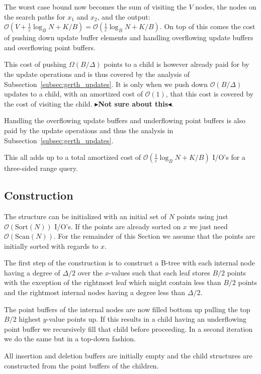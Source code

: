 \documentclass[twoside,11pt,openright]{report}
\def \epsilon {\varepsilon}
\newcommand{\todo}[1]{{\color[rgb]{.5,0,0}\textbf{$\blacktriangleright$#1$\blacktriangleleft$}}}
\begin{document}
The worst case bound now becomes the sum of visiting the $V$ nodes, the nodes on the search paths for $x_1$ and $x_2$, and the output: $\mathcal{O}(V+\frac{1}{\epsilon}\log_B N + K/B) = \mathcal{O}(\frac{1}{\epsilon}\log_B N + K/B)$.
On top of this comes the cost of pushing down update buffer elements and handling overflowing update buffers and overflowing point buffers.

This cost of pushing $\Omega(B/\Delta)$ points to a child is however already paid for by the update operations and is thus covered by the analysis of Subsection~\ref{subsec:gerth_updates}. It is only when we push down $\mathcal{O}(B/\Delta)$ updates to a child, with an amortized cost of $\mathcal{O}(1)$, that this cost is covered by the cost of visiting the child. \todo{Not sure about this}.

Handling the overflowing update buffers and underflowing point buffers is also paid by the update operations and thus the analysis in Subsection~\ref{subsec:gerth_updates}.

This all adds up to a total amortized cost of $\mathcal{O}(\frac{1}{\epsilon} \log_B N + K/B)$ I/O's for a three-sided range query.

\subsection{Construction}
The structure can be initialized with an initial set of $N$ points using just $\mathcal{O}(\text{Sort}(N))$ I/O's. If the points are already sorted on $x$ we just need $\mathcal{O}(\text{Scan}(N))$. For the remainder of this Section we assume that the points are initially sorted with regards to $x$.

The first step of the construction is to construct a B-tree with each internal node having a degree of $\Delta/2$ over the $x$-values such that each leaf stores $B/2$ points with the exception of the rightmost leaf which might contain less than $B/2$ points and the rightmost internal nodes having a degree less than $\Delta/2$.

The point buffers of the internal nodes are now filled bottom up pulling the top $B/2$ highest $y$-value points up. If this results in a child having an underflowing point buffer we recursively fill that child before proceeding. In a second iteration we do the same but in a top-down fashion.

All insertion and deletion buffers are initially empty and the child structures are constructed from the point buffers of the children.
\end{document}
